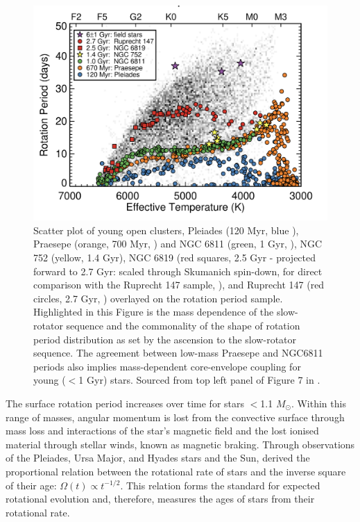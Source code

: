 \begin{figure}[h]
  \includegraphics[width=\textwidth]{Figures/intro_figures/cluster_kepler.png}
  \caption[Cluster rotation periods against effective temperature.]{Scatter plot of young open clusters, Pleiades (120 Myr, blue \citep{rebull_rotation_2016}), Praesepe (orange, 700 Myr, \citep{douglas_poking_2017, douglas_k2_2019}) and NGC 6811 (green, 1 Gyr, \citep{curtis_temporary_2019}), NGC 752 (yellow, 1.4 Gyr), NGC 6819 (red squares, 2.5 Gyr - projected forward to 2.7 Gyr: scaled through Skumanich spin-down, for direct comparison with the Ruprecht 147 sample, \citep{meibom_kepler_2011}), and Ruprecht 147 (red circles, 2.7 Gyr, \citep{curtis_when_2020}) overlayed on the \kepler{} \citep{mcquillan_rotation_2014} rotation period sample.
  Highlighted in this Figure is the mass dependence of the slow-rotator sequence and the commonality of the shape of rotation period distribution as set by the ascension to the slow-rotator sequence.
  The agreement between low-mass Praesepe and NGC6811 periods also implies mass-dependent core-envelope coupling for young ($<$1 Gyr) stars.
  Sourced from top left panel of Figure 7 in \citet{curtis_when_2020}.}
  \label{fig:cluster_rotational_periods}
\end{figure}

The surface rotation period increases over time for stars $<$1.1 $M_{\odot}$.
Within this range of masses, angular momentum is lost from the convective surface through mass loss and interactions of the star's magnetic field and the lost ionised material through stellar winds, known as magnetic braking.
Through observations of the Pleiades, Ursa Major, and Hyades stars and the Sun, \citet{skumanich_time_1972} derived the proportional relation between the rotational rate of stars and the inverse square of their age: $\Omega(t) \propto t^{-1/2}$.
This relation forms the standard for expected rotational evolution and, therefore, measures the ages of stars from their rotational rate.

